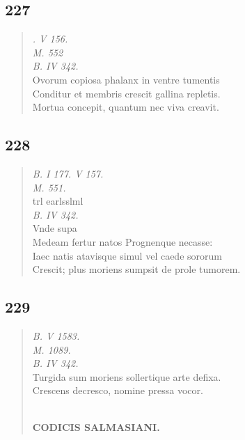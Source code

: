 \documentclass[11pt, a4paper]{report}
\begin{document}
            \subsection*{227}
      \begin{verse}
      \textit{. V 156.} \\ \textit{M. 552} \\ \textit{B. IV 342.} \\ Ovorum copiosa phalanx in ventre tumentis \\ Conditur et membris crescit gallina repletis. \\ Mortua concepit, quantum nec viva creavit. \\ 
      \end{verse}
  
            \subsection*{228}
      \begin{verse}
      \textit{B. I 177. V 157.} \\ \textit{M. 551.} \\ trl earlsslml \\ \textit{B. IV 342.} \\ Vnde supa \\ Medeam fertur natos Prognenque necasse: \\ Iaec natis atavisque simul vel caede sororum \\ Crescit; plus moriens sumpsit de prole tumorem. \\ 
      \end{verse}
  
            \subsection*{229}
      \begin{verse}
      \textit{B. V 1583.} \\ \textit{M. 1089.} \\ \textit{B. IV 342.} \\ Turgida sum moriens sollertique arte defixa. \\ Crescens decresco, nomine pressa vocor. \\ 
        ﻿\pagebreak 
    \begin{center} \textbf{CODICIS SALMASIANI.} \end{center} \marginpar{[191]} 
      \end{verse}
  
\end{document}
